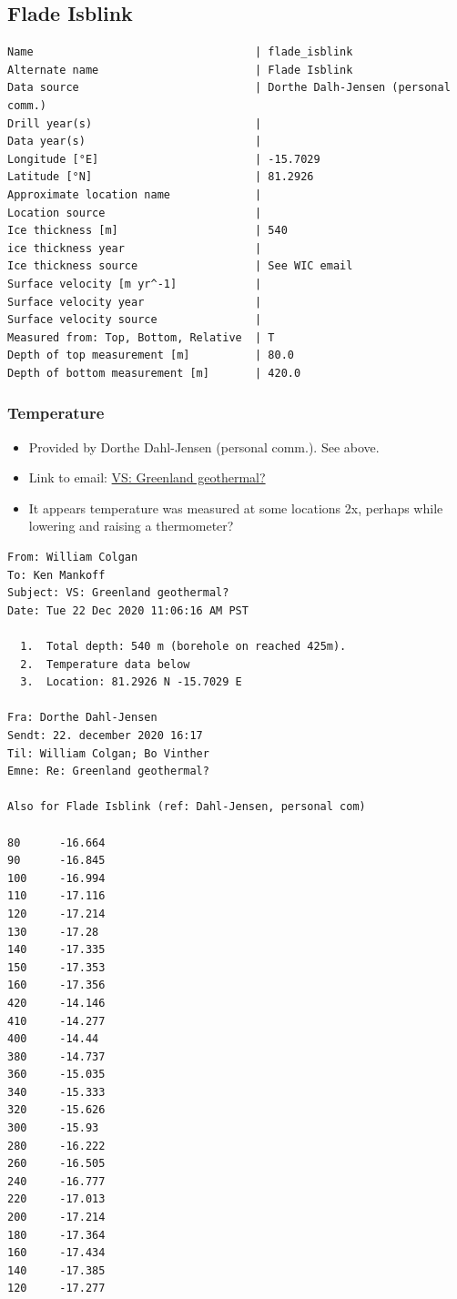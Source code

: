 \documentclass[article,a4paper,times,11pt,twoside]{article}
\begin{document}
\subsection{Flade Isblink}
\label{sec:orga526daf}
\begin{verbatim}
Name                                  | flade_isblink
Alternate name                        | Flade Isblink
Data source                           | Dorthe Dalh-Jensen (personal comm.)
Drill year(s)                         | 
Data year(s)                          | 
Longitude [°E]                        | -15.7029
Latitude [°N]                         | 81.2926
Approximate location name             | 
Location source                       | 
Ice thickness [m]                     | 540
ice thickness year                    | 
Ice thickness source                  | See WIC email
Surface velocity [m yr^-1]            | 
Surface velocity year                 | 
Surface velocity source               | 
Measured from: Top, Bottom, Relative  | T
Depth of top measurement [m]          | 80.0
Depth of bottom measurement [m]       | 420.0
\end{verbatim}

\subsubsection{Temperature}
\label{sec:orgb7847a4}

\begin{itemize}
\item Provided by Dorthe Dahl-Jensen (personal comm.). See above.
\item Link to email: \href{msgid:AM0PR04MB61299127D5D5EF0A7269A855A2DF0@AM0PR04MB6129.eurprd04.prod.outlook.com}{VS: Greenland geothermal?}
\item It appears temperature was measured at some locations 2x, perhaps while lowering and raising a thermometer?
\end{itemize}

\begin{verbatim}
From: William Colgan
To: Ken Mankoff
Subject: VS: Greenland geothermal?
Date: Tue 22 Dec 2020 11:06:16 AM PST

  1.  Total depth: 540 m (borehole on reached 425m).
  2.  Temperature data below
  3.  Location: 81.2926 N -15.7029 E

Fra: Dorthe Dahl-Jensen
Sendt: 22. december 2020 16:17
Til: William Colgan; Bo Vinther
Emne: Re: Greenland geothermal?

Also for Flade Isblink (ref: Dahl-Jensen, personal com)

80      -16.664
90      -16.845
100     -16.994
110     -17.116
120     -17.214
130     -17.28
140     -17.335
150     -17.353
160     -17.356
420     -14.146
410     -14.277
400     -14.44
380     -14.737
360     -15.035
340     -15.333
320     -15.626
300     -15.93
280     -16.222
260     -16.505
240     -16.777
220     -17.013
200     -17.214
180     -17.364
160     -17.434
140     -17.385
120     -17.277
\end{verbatim}
\end{document}
